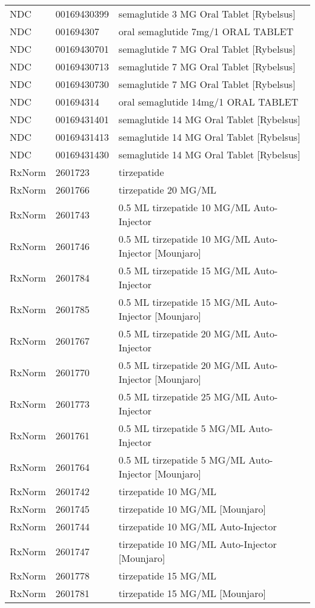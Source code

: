 \begin{longtable}{p{}p{}p{}}
  NDC & 00169430399 & semaglutide 3 MG Oral Tablet [Rybelsus] \\ 
  NDC & 001694307 & oral semaglutide 7mg/1 ORAL TABLET \\ 
  NDC & 00169430701 & semaglutide 7 MG Oral Tablet [Rybelsus] \\ 
  NDC & 00169430713 & semaglutide 7 MG Oral Tablet [Rybelsus] \\ 
  NDC & 00169430730 & semaglutide 7 MG Oral Tablet [Rybelsus] \\ 
  NDC & 001694314 & oral semaglutide 14mg/1 ORAL TABLET \\ 
  NDC & 00169431401 & semaglutide 14 MG Oral Tablet [Rybelsus] \\ 
  NDC & 00169431413 & semaglutide 14 MG Oral Tablet [Rybelsus] \\ 
  NDC & 00169431430 & semaglutide 14 MG Oral Tablet [Rybelsus] \\ 
  RxNorm & 2601723 & tirzepatide \\ 
  RxNorm & 2601766 & tirzepatide 20 MG/ML \\ 
  RxNorm & 2601743 & 0.5 ML tirzepatide 10 MG/ML Auto-Injector \\ 
  RxNorm & 2601746 & 0.5 ML tirzepatide 10 MG/ML Auto-Injector [Mounjaro] \\ 
  RxNorm & 2601784 & 0.5 ML tirzepatide 15 MG/ML Auto-Injector \\ 
  RxNorm & 2601785 & 0.5 ML tirzepatide 15 MG/ML Auto-Injector [Mounjaro] \\ 
  RxNorm & 2601767 & 0.5 ML tirzepatide 20 MG/ML Auto-Injector \\ 
  RxNorm & 2601770 & 0.5 ML tirzepatide 20 MG/ML Auto-Injector [Mounjaro] \\ 
  RxNorm & 2601773 & 0.5 ML tirzepatide 25 MG/ML Auto-Injector \\ 
  RxNorm & 2601761 & 0.5 ML tirzepatide 5 MG/ML Auto-Injector \\ 
  RxNorm & 2601764 & 0.5 ML tirzepatide 5 MG/ML Auto-Injector [Mounjaro] \\ 
  RxNorm & 2601742 & tirzepatide 10 MG/ML \\ 
  RxNorm & 2601745 & tirzepatide 10 MG/ML [Mounjaro] \\ 
  RxNorm & 2601744 & tirzepatide 10 MG/ML Auto-Injector \\ 
  RxNorm & 2601747 & tirzepatide 10 MG/ML Auto-Injector [Mounjaro] \\ 
  RxNorm & 2601778 & tirzepatide 15 MG/ML \\ 
  RxNorm & 2601781 & tirzepatide 15 MG/ML [Mounjaro] \\ 

\end{longtable}
